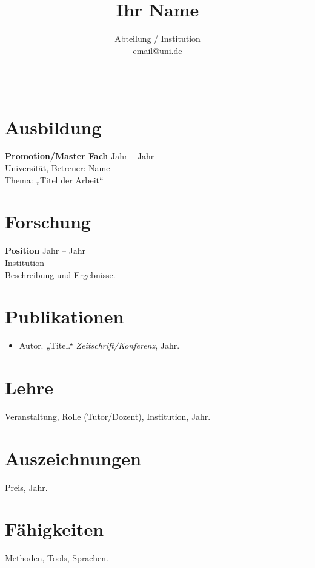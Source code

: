 \documentclass[11pt,a4paper]{article}
\title{\vspace{-1cm}\textbf{Ihr Name}}
\author{Abteilung / Institution \\ \href{mailto:email@uni.de}{email@uni.de}}
\date{}
\begin{document}
\maketitle
\vspace{-0.6cm}
\begin{flushright}\rule{2cm}{2.5cm}\end{flushright}
\section*{Ausbildung}
\textbf{Promotion/Master Fach} \hfill Jahr -- Jahr \\
Universität, Betreuer: Name \\
Thema: „Titel der Arbeit“

\section*{Forschung}
\textbf{Position} \hfill Jahr -- Jahr \\
Institution \\
Beschreibung und Ergebnisse.

\section*{Publikationen}
\begin{itemize}
  \item Autor. „Titel.“ \textit{Zeitschrift/Konferenz}, Jahr.
\end{itemize}

\section*{Lehre}
Veranstaltung, Rolle (Tutor/Dozent), Institution, Jahr.

\section*{Auszeichnungen}
Preis, Jahr.

\section*{Fähigkeiten}
Methoden, Tools, Sprachen.
\end{document}
